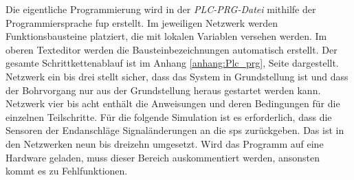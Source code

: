 Die eigentliche Programmierung wird in der \textit{PLC-PRG-Datei} mithilfe der Programmiersprache \ac{fup} erstellt. Im jeweiligen Netzwerk werden Funktionsbausteine platziert, die mit lokalen Variablen versehen werden. Im oberen Texteditor werden die Bausteinbezeichnungen automatisch erstellt. Der gesamte Schrittkettenablauf ist im Anhang \ref{anhang:Plc_prg}, Seite \pageref{anhang:Plc_prg} dargestellt.\\
Netzwerk ein bis drei stellt sicher, dass das System in Grundstellung ist und dass der Bohrvorgang nur aus der Grundstellung heraus gestartet werden kann. Netzwerk vier bis acht enthält die Anweisungen und deren Bedingungen für die einzelnen Teilschritte. Für die folgende Simulation ist es erforderlich, dass die Sensoren der Endanschläge Signaländerungen an die \ac{sps} zurückgeben. Das ist in den Netzwerken neun bis dreizehn umgesetzt. Wird das Programm auf eine Hardware geladen, muss dieser Bereich auskommentiert werden, ansonsten kommt es zu Fehlfunktionen.
